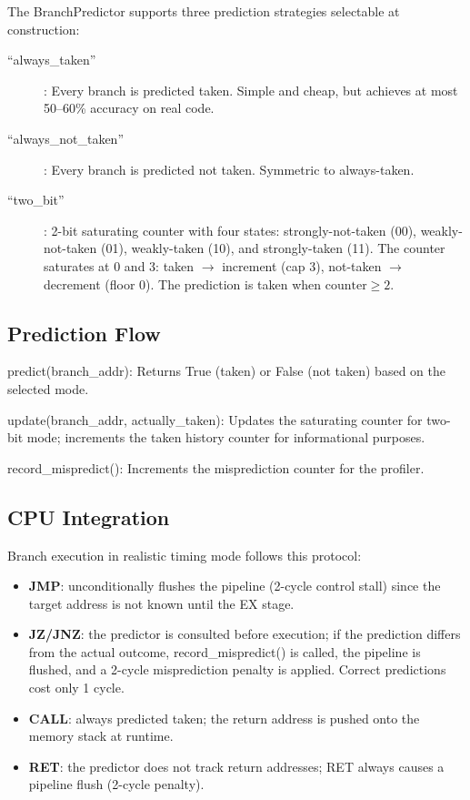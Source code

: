 \documentclass[12pt,a4paper,twoside]{book}
\theoremstyle{trinarytheorem}
\theoremstyle{trinarydefinition}
\newcommand{\code}[1]{\textsf{#1}}
\begin{document}
The \code{BranchPredictor} supports three prediction strategies selectable
at construction:

\begin{description}
    \item[\code{``always\_taken''}]: Every branch is predicted taken.
          Simple and cheap, but achieves at most 50--60\% accuracy on
          real code.
    \item[\code{``always\_not\_taken''}]: Every branch is predicted not
          taken. Symmetric to always-taken.
    \item[\code{``two\_bit''}]: 2-bit saturating counter with four states:
          strongly-not-taken (00), weakly-not-taken (01), weakly-taken (10),
          and strongly-taken (11). The counter saturates at 0 and 3:
          taken $\rightarrow$ increment (cap 3), not-taken $\rightarrow$
          decrement (floor 0). The prediction is taken when
          $\text{counter} \ge 2$.
\end{description}

\subsection{Prediction Flow}

\noindent\code{predict(branch\_addr)}: Returns \code{True} (taken) or
\code{False} (not taken) based on the selected mode.

\noindent\code{update(branch\_addr, actually\_taken)}: Updates the
saturating counter for two-bit mode; increments the taken history counter
for informational purposes.

\noindent\code{record\_mispredict()}: Increments the misprediction counter
for the profiler.

\subsection{CPU Integration}

Branch execution in realistic timing mode follows this protocol:
\begin{itemize}
    \item \textbf{JMP}: unconditionally flushes the pipeline (2-cycle control
          stall) since the target address is not known until the EX stage.
    \item \textbf{JZ/JNZ}: the predictor is consulted before execution; if
          the prediction differs from the actual outcome,
          \code{record\_mispredict()} is called, the pipeline is flushed,
          and a 2-cycle misprediction penalty is applied. Correct predictions
          cost only 1 cycle.
    \item \textbf{CALL}: always predicted taken; the return address is pushed
          onto the memory stack at runtime.
    \item \textbf{RET}: the predictor does not track return addresses; RET
          always causes a pipeline flush (2-cycle penalty).
\end{itemize}
\end{document}
